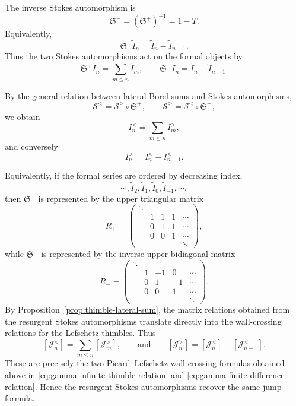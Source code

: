 \documentclass[11pt]{amsart}
\theoremstyle{plain}
\newcommand{\J}{\mathcal J}
\begin{document}
The inverse Stokes automorphism is
\begin{equation}\label{eq:gamma-stokes-inverse}
\mathfrak S^-=(\mathfrak S^+)^{-1}=1-T.
\end{equation}
Equivalently,
\begin{equation*}\label{eq:gamma-stokes-minus-formal}
\mathfrak S^-\widetilde I_n
=
\widetilde I_n-\widetilde I_{n-1}.
\end{equation*}
Thus the two Stokes automorphisms act on the formal objects by
\[
\mathfrak S^+\widetilde I_n
=
\sum_{m\le n}\widetilde I_m,
\qquad
\mathfrak S^-\widetilde I_n
=
\widetilde I_n-\widetilde I_{n-1}.
\]

By the general relation between lateral Borel sums and Stokes automorphisms,
\[
\mathcal S^{<}=\mathcal S^{>}\circ\mathfrak S^+,
\qquad
\mathcal S^{>}=\mathcal S^{<}\circ\mathfrak S^-,
\]
we obtain
\begin{equation*}\label{eq:gamma-integral-stokes-plus}
I_n^{<}
=
\sum_{m\le n}I_m^{>},
\end{equation*}
and conversely
\begin{equation*}\label{eq:gamma-integral-stokes-minus}
I_n^{>}
=
I_n^{<}-I_{n-1}^{<}.
\end{equation*}

Equivalently, if the formal series are ordered by decreasing index,
\[
\cdots,\widetilde I_2,\widetilde I_1,\widetilde I_0,\widetilde I_{-1},\cdots,
\]
then \(\mathfrak S^+\) is represented by the upper triangular matrix
\[
R_+
=
\begin{pmatrix}
\ddots &        &        &        &        \\
       & 1      & 1      & 1      & \cdots \\
       & 0      & 1      & 1      & \cdots \\
       & 0      & 0      & 1      & \cdots \\
       &        &        &        & \ddots
\end{pmatrix},
\]
while \(\mathfrak S^-\) is represented by the inverse upper bidiagonal matrix
\[
R_-
=
\begin{pmatrix}
\ddots &        &        &        &        \\
       & 1      & -1     & 0      & \cdots \\
       & 0      & 1      & -1     & \cdots \\
       & 0      & 0      & 1      & \cdots \\
       &        &        &        & \ddots
\end{pmatrix}.
\]
By Proposition~\ref{prop:thimble-lateral-sum}, the matrix relations obtained
from the resurgent Stokes automorphisms translate directly into the
wall-crossing relations for the Lefschetz thimbles.  Thus
\begin{equation*}\label{eq:gamma-thimble-stokes-plus}
[\J_n^{<}]
=
\sum_{m\le n}[\J_m^{>}],
\qquad \text{and} \qquad 
[\J_n^{>}]
=
[\J_n^{<}]-[\J_{n-1}^{<}].
\end{equation*}
These are precisely the two Picard--Lefschetz wall-crossing formulas
obtained above in \eqref{eq:gamma-infinite-thimble-relation} and
\eqref{eq:gamma-finite-difference-relation}.  Hence the resurgent Stokes
automorphisms recover the same jump formula.
\end{document}
